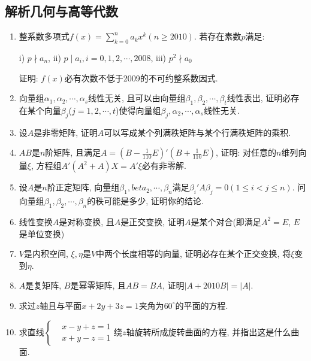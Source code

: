 \documentclass[12pt,a4paper,openany]{book}
\begin{document}
\subsection{解析几何与高等代数}
\begin{enumerate}
\item 整系数多项式$f(x) = \sum\limits_{k=0}^{n}{a_kx^k} (n \ge 2010)$. 若存在素数$p$满足: 

i) $p \nmid a_n$, ii) $p \mid a_i, i = 0, 1, 2, \cdots, 2008$, iii) $p^2 \nmid a_0$

证明: $f(x)$必有次数不低于2009的不可约整系数因式.

\item 向量组$\alpha_1, \alpha_2, \cdots, \alpha_s$线性无关, 且可以由向量组$\beta_1, \beta_2, \cdots, \beta_t$线性表出, 证明必存在某个向量$\beta_j$($j = 1,2, \cdots, t$)使得向量组$\beta_j, \alpha_2, \cdots, \alpha_s$线性无关.

\item 设$A$是非零矩阵, 证明$A$可以写成某个列满秩矩阵与某个行满秩矩阵的乘积.

\item $AB$是$n$阶矩阵, 且满足$A = \displaystyle(B - \frac{1}{110}E)'(B + \frac{1}{110}E)$, 证明: 对任意的$n$维列向量$\xi$, 方程组$A'(A^2 + A)X = A'\xi$必有非零解.

\item 设$A$是$n$阶正定矩阵, 向量组$\beta_1, beta_2, \cdots, \beta_n$满足$\beta_i'A\beta_j = 0 (1 \le i < j \le n)$. 问向量组$\beta_1, \beta_2, \cdots, \beta_n$的秩可能是多少, 证明你的结论.

\item 线性变换$A$是对称变换, 且$A$是正交变换, 证明$A$是某个对合(即满足$A^2 = E$, $E$是单位变换)

\item $V$是内积空间, $\xi, \eta$是$V$中两个长度相等的向量, 证明必存在某个正交变换, 将$\xi$变到$\eta$.

\item $A$是复矩阵, $B$是幂零矩阵, 且$AB = BA$, 证明$|A + 2010B| = |A|$.

\item 求过$z$轴且与平面$x + 2y + 3z = 1$夹角为$60^{\circ}$的平面的方程.

\item 求直线$\left\{\begin{aligned} &x - y + z = 1 \\ &x + y - z = 1 \end{aligned}\right.$绕$z$轴旋转所成旋转曲面的方程, 并指出这是什么曲面.


\end{enumerate}
\end{document}
